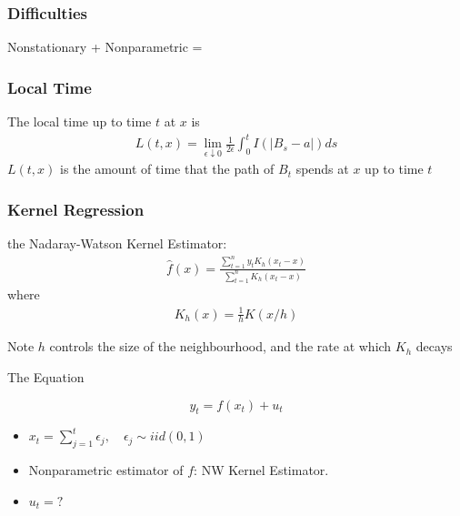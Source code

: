 \documentclass{beamer}
\begin{document}
\begin{frame}[c]\frametitle{Difficulties}
  Nonstationary + Nonparametric =\alert{
  }
\end{frame}

\begin{frame}[t]\frametitle{Local Time}
  \begin{definition}
    The local time up to time $t$ at $x$ is
    \begin{align*}
      L(t,x) = \lim_{\epsilon \downarrow 0} \frac{1}{2 \epsilon} \int_{0}^{t} I(|B_s-a|) ds
    \end{align*}
    \pause
    \alert{$L(t,x)$ is the amount of time that the path of $B_t$ spends at $x$ up to time $t$}
  \end{definition}
\end{frame}

\begin{frame}[c]\frametitle{Kernel Regression}
  the Nadaray-Watson Kernel Estimator:
  \begin{align*}
    \hat{f}(x) = \frac{\sum_{t=1}^{n} y_t K_h(x_t-x)}{\sum_{t=1}^{n} K_h(x_t-x)} 
  \end{align*}
  where
  \begin{align*}
    K_h(x) = \frac{1}{h} K(x/h)
  \end{align*}
  \pause
  \begin{block}{Note}
    $h$ controls the size of the neighbourhood, and the rate at which $K_h$ decays
  \end{block}
\end{frame}

\begin{frame}[t]{The Equation}
  
  \begin{equation*}
    y_t
    = 
    f(x_t) + u_t
  \end{equation*}
  
  \begin{itemize}
    \item $x_t = \sum_{j=1}^{t} \epsilon_j,\quad \epsilon_{j}\sim iid(0,1)$
    \item Nonparametric estimator of $f$: NW Kernel Estimator.
    \item \alert{$u_t = ?$}
  \end{itemize}

\end{frame}
\end{document}
